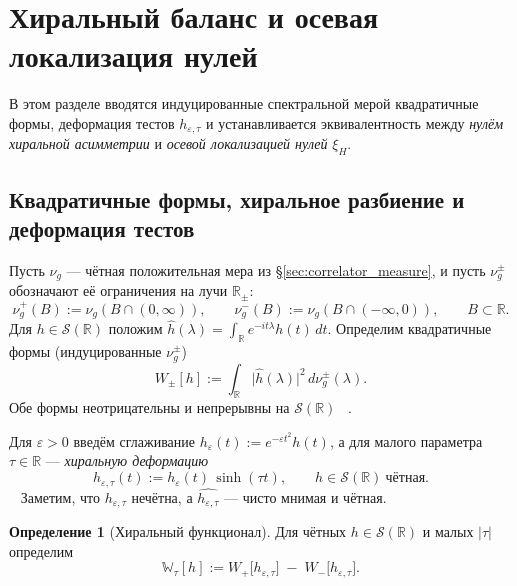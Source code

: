 \documentclass{article}
\numberwithin{equation}{section}
\theoremstyle{plain}
\theoremstyle{definition}
\newtheorem{definition}{Определение}
\theoremstyle{remark}
\def\infty{∞}\def\partial{∂}\def\sum{Σ}\def\int{∫}%
\begin{document}
\clearpage

\section{Хиральный баланс и осевая локализация нулей}
\label{sec:chiral_balance}

В этом разделе вводятся индуцированные спектральной мерой квадратичные формы,
деформация тестов $h_{\varepsilon,\tau}$ и устанавливается эквивалентность
между \emph{нулём хиральной асимметрии} и \emph{осевой локализацией нулей} $\xi_H$.

\subsection{Квадратичные формы, хиральное разбиение и деформация тестов}

Пусть $\nu_g$ — чётная положительная мера из §\ref{sec:correlator_measure},
и пусть $\nu_g^\pm$ обозначают её ограничения на лучи $\mathbb R_\pm$:
\begin{equation}
\label{eq:nu_pm}
\nu_g^+(B):=\nu_g(B\cap(0,\infty)),\qquad
\nu_g^-(B):=\nu_g(B\cap(-\infty,0)),\qquad B\subset\mathbb R.
\end{equation}
Для $h\in\mathcal S(\mathbb R)$ положим $\widehat h(\lambda)=\int_{\mathbb R}e^{-it\lambda}h(t)\,dt$.
Определим квадратичные формы (индуцированные $\nu_g^\pm$)
\begin{equation}
\label{eq:Wpm_def}
W_\pm[h]:=\int_{\mathbb R}\bigl|\widehat h(\lambda)\bigr|^2\,d\nu_g^\pm(\lambda).
\end{equation}
Обе формы неотрицательны и непрерывны на $\mathcal S(\mathbb R)$ ~\cite{Simon2005}.

Для $\varepsilon>0$ введём сглаживание $h_\varepsilon(t):=e^{-\varepsilon t^2}h(t)$,
а для малого параметра $\tau\in\mathbb R$ — \emph{хиральную деформацию}
\begin{equation}
\label{eq:deform}
h_{\varepsilon,\tau}(t):=h_\varepsilon(t)\,\sinh(\tau t),\qquad h\in\mathcal S(\mathbb R)\ \text{чётная}.
\end{equation}
~\cite{GlimmJaffe1987}
Заметим, что $h_{\varepsilon,\tau}$ нечётна, а $\widehat{h_{\varepsilon,\tau}}$ — чисто мнимая и чётная.

\begin{definition}[Хиральный функционал]
\label{def:Wtau}
Для чётных $h\in\mathcal S(\mathbb R)$ и малых $|\tau|$ определим
\begin{equation}
\label{eq:Wtau_def}
\mathbb W_\tau[h]:=W_+\!\big[h_{\varepsilon,\tau}\big]\;-\;W_-\!\big[h_{\varepsilon,\tau}\big].
\end{equation}
\end{definition}
\end{document}
